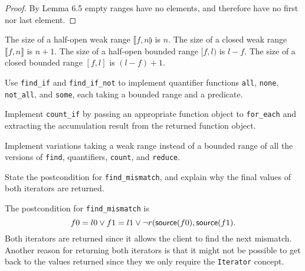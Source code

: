 \begin{proof}
	By Lemma 6.5 empty ranges have no elements, and therefore have no first nor last element.
\end{proof}

\begin{lemma}
	The size of a half-open weak range $\llbracket f, n \rrparenthesis$ is $n$. The size of a
	closed weak range $\llbracket f, n \rrbracket$ is $n + 1$. The size of a half-open bounded
	range $[f, l)$ is $l - f$. The size of a closed bounded range $[f, l]$ is $(l - f) + 1$.
\end{lemma}

\begin{exercise}
	Use \verb|find_if| and \verb|find_if_not| to implement quantifier functions \verb|all|,
	\verb|none|, \verb|not_all|, and \verb|some|, each taking a bounded range and a predicate.
\end{exercise}



\begin{exercise}
	Implement \verb|count_if| by passing an appropriate function object to \verb|for_each|
	and extracting the accumulation result from the returned function object.
\end{exercise}



\begin{exercise}
	Implement variations taking a weak range instead of a bounded range of all the versions
	of \verb|find|, quantifiers, \verb|count|, and \verb|reduce|.
\end{exercise}



\begin{exercise}
	State the postcondition for \verb|find_mismatch|, and explain why the final values
	of both iterators are returned.
\end{exercise}

\begin{solution}
	The postcondition for \verb|find_mismatch| is
	\[ f0 = l0 \vee f1 = l1 \vee \lnot r(\mathsf{source}(f0), \mathsf{source}(f1). \]
	Both iterators are returned since it allows the client to find the next mismatch.
	Another reason for returning both iterators is that it might not be possible
	to get back to the values returned since they we only require the \verb|Iterator|
	concept.
\end{solution}

